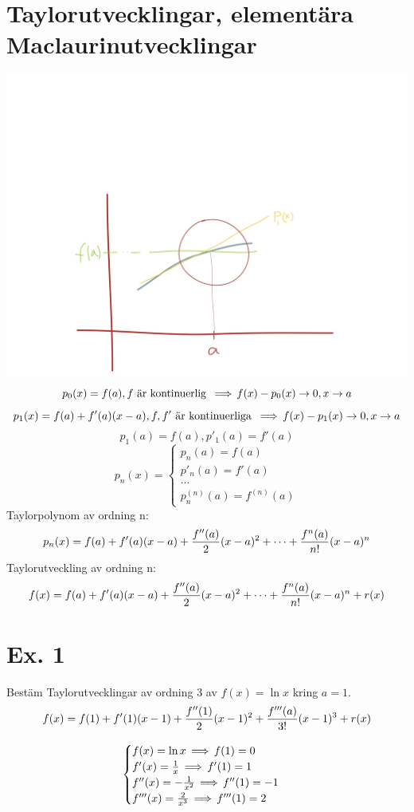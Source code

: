 \documentclass{article}
\begin{document}
  \section{Taylorutvecklingar, elementära Maclaurinutvecklingar}
  \includegraphics[scale=0.20]{img/img1.jpg}
  $$ p_0(x) = f(a), f \text{ är kontinuerlig } \operatorname{\implies} f(x)-p_0(x)\to 0, x\to a  $$
  $$ p_1(x) = f(a)+f'(a)(x-a), f, f' \text{ är kontinuerliga } \operatorname{\implies} f(x) - p_1(x) \to 0, x\to a $$
  $$ p_1(a) = f(a), p'_1(a)=f'(a) $$
  $$ p_n(x) =
  \begin{cases}
    p_n(a)=f(a)\\
    p'_n(a)=f'(a)\\
    \hdots\\
    p_n^{(n)}(a)=f^{(n)}(a)
  \end{cases}
  $$
  Taylorpolynom av ordning n:
  $$ p_n(x) = f(a) + f'(a)(x-a) + \frac{f''(a)}{2}(x-a)^2+\dots+\frac{f^{n}(a)}{n!}(x-a)^n$$
  Taylorutveckling av ordning n:
  $$ f(x) = f(a) + f'(a)(x-a) + \frac{f''(a)}{2}(x-a)^2+\dots+\frac{f^{n}(a)}{n!}(x-a)^n + r(x)$$

  \section{Ex. 1}
  Bestäm Taylorutvecklingar av ordning 3 av $f(x)=\ln x$ kring $a=1$.
  $$ f(x) = f(1) + f'(1)(x-1) + \frac{f''(1)}{2} (x-1)^2+\frac{f'''(a)}{3!}(x-1)^3 + r(x)$$

  $$
  \begin{cases}
    f(x) = \ln x \operatorname{\implies} f(1) = 0\\
    f'(x) = \frac{1}{x} \operatorname{\implies} f'(1) = 1\\
    f''(x) = -\frac{1}{x^2} \operatorname{\implies} f''(1) = -1\\
    f'''(x) = \frac{2}{x^3} \operatorname{\implies} f'''(1) = 2
  \end{cases}
  $$
\end{document}
